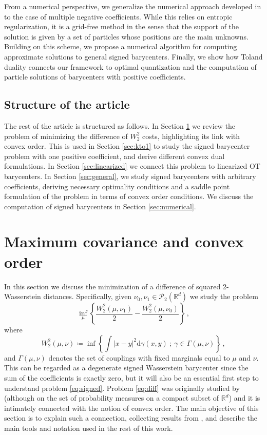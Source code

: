 \documentclass[12pt]{amsart}
\numberwithin{equation}{section}
\let\mc=\mathcal
\def\ed{\mathrm{d}}
\theoremstyle{plain}
\theoremstyle{definition}
\begin{document}
From a numerical perspective, we generalize the numerical approach developed in \cite{gallouet2025metric} to the case of multiple negative coefficients. While this relies on entropic regularization, it is a grid-free method in the sense that the support of the solution is given by a set of particles whose positions are the main unknowns. Building on this scheme, we propose a numerical algorithm for  computing approximate solutions to general signed barycenters. Finally,  we show how Toland duality connects our framework to optimal quantization and the computation of particle solutions of barycenters with positive coefficients. 

\subsection{Structure of the article} The rest of the article is structured as follows. In Section \ref{sec:mcov} we review the problem of minimizing the difference of $W_2^2$ costs, highlighting its link with convex order. This is used in Section \ref{sec:kto1} to study the signed barycenter problem with one positive coefficient, and derive different convex dual formulations. In Section \ref{sec:linearized} we connect this problem to linearized OT barycenters. In Section \ref{sec:general}, we study signed barycenters with arbitrary coefficients, deriving necessary optimality conditions and a saddle point formulation of the problem in terms of convex order conditions.  We discuss the computation of signed barycenters in Section \ref{sec:numerical}.  

\section{Maximum covariance and convex order}
\label{sec:mcov}
In this section we discuss the minimization of a difference of squared 2-Wasserstein distances. Specifically, given $\nu_0,\nu_1\in\mc{P}_2(\mathbb{R}^d)$ we study the problem
\begin{equation}\label{eq:diff}
\inf_\mu \left \{ \frac{W^2_2(\mu,\nu_1)}{2} - \frac{W^2_2(\mu,\nu_0)}{2}  \right\}\,,
\end{equation}
where 
 \[
 W^2_2(\mu,\nu) \coloneqq \inf \left\{ \int |x-y|^2 \ed \gamma(x,y) ~ ; ~\gamma \in \Gamma(\mu,\nu) \right\}\,,
 \]
and $\Gamma(\mu,\nu)$ denotes the set of couplings with fixed marginals equal to $\mu$ and $\nu$.
This can be regarded as a degenerate signed Wasserstein barycenter since the sum of the coefficients is exactly zero, but it will also be an essential first step to understand problem \eqref{eq:signed}. Problem \eqref{eq:diff} was originally studied by \cite{carlier2008Toland} (although on the set of probability measures on a compact subset of $\mathbb{R}^d$) and it is intimately connected with the notion of convex order. The main objective of this section is to explain such a connection, collecting results from \cite{carlier2008Toland,ekeland2014optimal,bertucci2024approximation,beiglbock2025brenier}, and describe the main tools and notation used in the rest of this work.
\end{document}
